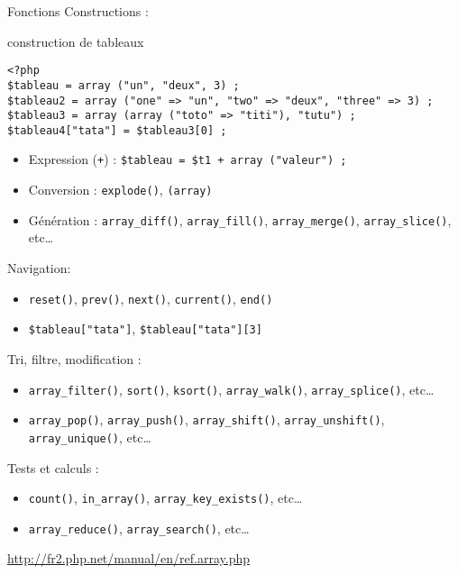 \begin{frame}[containsverbatim]{Fonctions}
	Constructions :
	\begin{block}{construction de tableaux}
		\begin{lstlisting}
<?php
$tableau = array ("un", "deux", 3) ;
$tableau2 = array ("one" => "un", "two" => "deux", "three" => 3) ;
$tableau3 = array (array ("toto" => "titi"), "tutu") ;
$tableau4["tata"] = $tableau3[0] ;
		\end{lstlisting}
	\end{block}
	\begin{itemize}
		\item Expression (\texttt{+}) : \lstinline~$tableau = $t1 + array ("valeur") ;~
		\item Conversion : \lstinline~explode()~, \lstinline~(array)~
		\item Génération : \lstinline~array_diff()~, \lstinline~array_fill()~, \lstinline~array_merge()~, \lstinline~array_slice()~, etc\ldots
	\end{itemize}
	Navigation:
	\begin{itemize}
		\item \lstinline~reset()~, \lstinline~prev()~, \lstinline~next()~, \lstinline~current()~, \lstinline~end()~ 
		\item \lstinline~$tableau["tata"]~, \lstinline~$tableau["tata"][3]~
	\end{itemize}
	Tri, filtre, modification :
	\begin{itemize}
		\item \lstinline~array_filter()~, \lstinline~sort()~, \lstinline~ksort()~, \lstinline~array_walk()~, \lstinline~array_splice()~, etc\ldots
		\item \lstinline~array_pop()~, \lstinline~array_push()~, \lstinline~array_shift()~, \lstinline~array_unshift()~, \lstinline~array_unique()~, etc\ldots
	\end{itemize}
		Tests et calculs :
	\begin{itemize}
		\item \lstinline~count()~, \lstinline~in_array()~, \lstinline~array_key_exists()~, etc\ldots
		\item \lstinline~array_reduce()~, \lstinline~array_search()~, etc\ldots
	\end{itemize}
	\url{http://fr2.php.net/manual/en/ref.array.php}\\
\end{frame}
 
